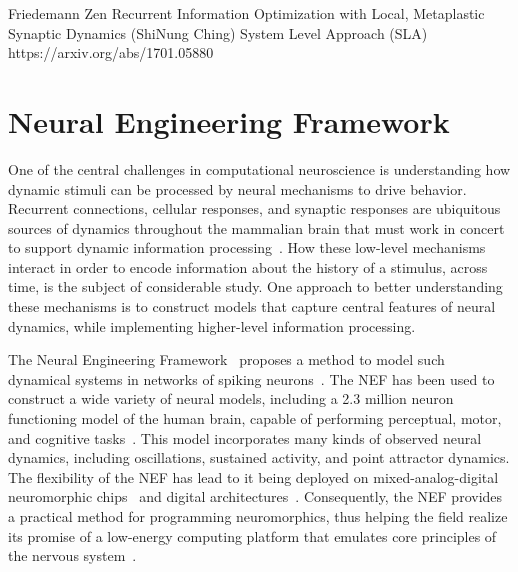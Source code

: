 Friedemann Zen
Recurrent Information Optimization with Local, Metaplastic Synaptic Dynamics (ShiNung Ching)
System Level Approach (SLA) https://arxiv.org/abs/1701.05880


\section{Neural Engineering Framework}

One of the central challenges in computational neuroscience is understanding how dynamic stimuli can be processed by neural mechanisms to drive behavior.
Recurrent connections, cellular responses, and synaptic responses are ubiquitous sources of dynamics throughout the mammalian brain that must work in concert to support dynamic information processing~\citep{kandel2000principles}.
How these low-level mechanisms interact in order to encode information about the history of a stimulus, across time, is the subject of considerable study.
One approach to better understanding these mechanisms is to construct models that capture central features of neural dynamics, while implementing higher-level information processing.




The Neural Engineering Framework~\citep[NEF;][]{eliasmith1999developing, eliasmith2003a} proposes a method to model such dynamical systems in networks of spiking neurons~\citep[see][for reviews of other methods]{abbott2016building, deneve2016efficient}.
The NEF has been used to construct a wide variety of neural models, including a 2.3 million neuron functioning model of the human brain, capable of performing perceptual, motor, and cognitive tasks~\citep{eliasmith2012large}.
This model incorporates many kinds of observed neural dynamics, including oscillations, sustained activity, and point attractor dynamics.
The flexibility of the NEF has lead to it being deployed on mixed-analog-digital neuromorphic chips~\citep{choudhary2012silicon, corradi2014, voelker2017iscas, voelker2017neuromorphic} and digital architectures~\citep{bekolay2013nengo, wang2014compact, mundy2015efficient, berzish2016}.
Consequently, the NEF provides a practical method for programming neuromorphics, thus helping the field realize its promise of a low-energy computing platform that emulates core principles of the nervous system~\citep{boahen2017neuromorph}.


